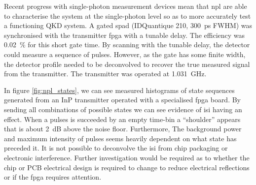 Recent progress with single-photon measurement devices mean that \ac{npl} are able to characterise the system at the single-photon level so as to more accurately test a functioning \ac{QKD} system. A gated \ac{spad} (IDQuantique 210, \SI{300}{ps} \ac{FWHM}) was synchronised with the transmitter \ac{fpga} with a tunable delay. The efficiency was \SI{0.02}{\percent} for this short gate time. By scanning with the tunable delay, the detector could measure a sequence of pulses. However, as the gate has some finite width, the detector profile needed to be deconvolved to recover the true measured signal from the transmitter. The transmitter was operated at \SI{1.031}{GHz}. 






In figure \ref{fig:npl_states}, we can see measured histograms of state sequences generated from an \ac{InP} transmitter operated with a specialised \ac{fpga} board. By sending all combinations of possible states we can see evidence of \ac{isi} having an effect. When a pulses is succeeded by an empty time-bin a ``shoulder'' appears that is about \SI{2}{dB} above the noise floor. Furthermore, The background power and maximum intensity of pulses seems heavily dependent on what state has preceded it. It is not possible to deconvolve the \ac{isi} from chip packaging or electronic interference. Further investigation would be required as to whether the chip or PCB electrical design is required to change to reduce electrical reflections or if the \ac{fpga} requires attention.


